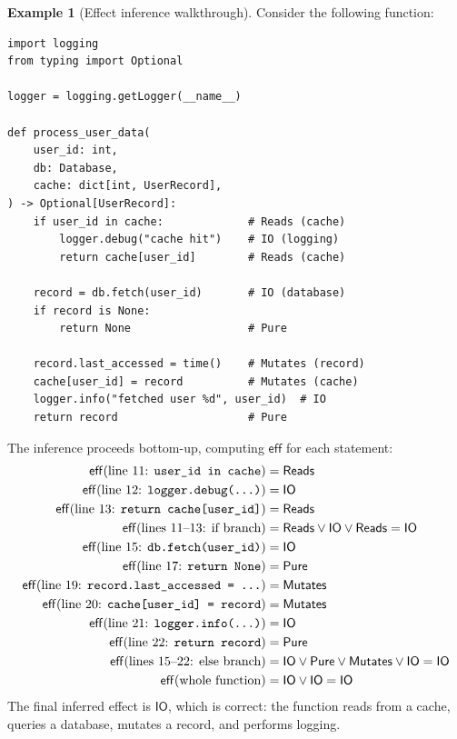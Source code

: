 \documentclass[11pt,a4paper]{report}
\theoremstyle{definition}
\newtheorem{example}[definition]{Example}
\theoremstyle{plain}
\newcommand{\Pure}{\mathsf{Pure}}
\newcommand{\Reads}{\mathsf{Reads}}
\newcommand{\Mutates}{\mathsf{Mutates}}
\newcommand{\IO}{\mathsf{IO}}
\begin{document}
\begin{example}[Effect inference walkthrough]
\label{ex:effect-inference-worked}
Consider the following function:
\begin{lstlisting}[style=python]
import logging
from typing import Optional

logger = logging.getLogger(__name__)

def process_user_data(
    user_id: int,
    db: Database,
    cache: dict[int, UserRecord],
) -> Optional[UserRecord]:
    if user_id in cache:             # Reads (cache)
        logger.debug("cache hit")    # IO (logging)
        return cache[user_id]        # Reads (cache)

    record = db.fetch(user_id)       # IO (database)
    if record is None:
        return None                  # Pure

    record.last_accessed = time()    # Mutates (record)
    cache[user_id] = record          # Mutates (cache)
    logger.info("fetched user %d", user_id)  # IO
    return record                    # Pure
\end{lstlisting}

The inference proceeds bottom-up, computing $\mathsf{eff}$ for each statement:
\begin{align}
  \mathsf{eff}(\text{line 11: \texttt{user\_id in cache}}) &= \Reads \\
  \mathsf{eff}(\text{line 12: \texttt{logger.debug(...)}}) &= \IO \\
  \mathsf{eff}(\text{line 13: \texttt{return cache[user\_id]}}) &= \Reads \\
  \mathsf{eff}(\text{lines 11--13: if branch}) &= \Reads \vee \IO \vee \Reads = \IO \\
  \mathsf{eff}(\text{line 15: \texttt{db.fetch(user\_id)}}) &= \IO \\
  \mathsf{eff}(\text{line 17: \texttt{return None}}) &= \Pure \\
  \mathsf{eff}(\text{line 19: \texttt{record.last\_accessed = ...}}) &= \Mutates \\
  \mathsf{eff}(\text{line 20: \texttt{cache[user\_id] = record}}) &= \Mutates \\
  \mathsf{eff}(\text{line 21: \texttt{logger.info(...)}}) &= \IO \\
  \mathsf{eff}(\text{line 22: \texttt{return record}}) &= \Pure \\
  \mathsf{eff}(\text{lines 15--22: else branch}) &= \IO \vee \Pure \vee \Mutates \vee \IO = \IO \\
  \mathsf{eff}(\text{whole function}) &= \IO \vee \IO = \IO
\end{align}
The final inferred effect is $\IO$, which is correct: the function reads from
a cache, queries a database, mutates a record, and performs logging.
\end{example}
\end{document}
